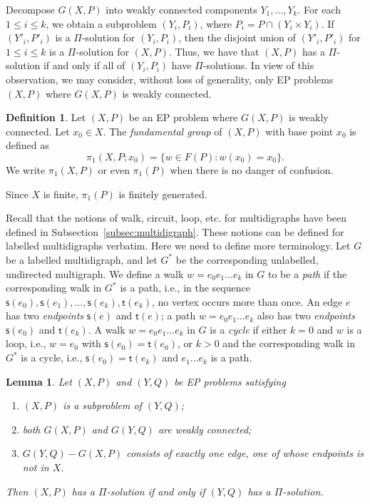 \documentclass[11pt]{amsart}
\newtheorem{lemma}[theorem]{Lemma}
\theoremstyle{definition}
\newtheorem{definition}[theorem]{Definition}
\theoremstyle{definition}
\numberwithin{equation}{section}
\begin{document}
Decompose $G(X, P)$ into weakly connected components $Y_1, \dots, Y_k$. For each $1\leq i\leq k$, we obtain a subproblem $(Y_i, P_i)$, where $P_i=P\cap (Y_i\times Y_i)$. If $(Y'_i, P'_i)$ is a $\Pi$-solution for $(Y_i, P_i)$, then the disjoint union of $(Y'_i, P'_i)$ for $1\leq i\leq k$ is a $\Pi$-solution for $(X, P)$. Thus, we have that $(X, P)$ has a $\Pi$-solution if and only if all of $(Y_i, P_i)$ have $\Pi$-solutions. In view of this observation, we may consider, without loss of generality, only EP problems $(X, P)$ where $G(X, P)$ is weakly connected. 

\begin{definition} Let $(X, P)$ be an EP problem where $G(X, P)$ is weakly connected. Let $x_0\in X$. The {\em fundamental group} of $(X, P)$ with base point $x_0$ is defined as
$$ \pi_1(X, P; x_0)=\{w\in F(P)\colon w(x_0)=x_0\}. $$
We write $\pi_1(X, P)$ or even $\pi_1(P)$ when there is no danger of confusion.
\end{definition}

Since $X$ is finite, $\pi_1(P)$ is finitely generated. 

Recall that the notions of walk, circuit, loop, etc. for multidigraphs have been defined in Subsection~\ref{subsec:multidigraph}.  These notions can be defined for labelled multidigraphs verbatim. Here we need to define more terminology. Let $G$ be a labelled multidigraph, and let $G^*$ be the corresponding unlabelled, undirected multigraph. We define a walk $w=e_0e_1\dots e_k$ in $G$ to be a {\em path} if the corresponding walk in $G^*$ is a path, i.e., in the sequence $\mathsf{s}(e_0), \mathsf{s}(e_1), \dots, \mathsf{s}(e_k), \mathsf{t}(e_k)$, no vertex occurs more than once. An edge $e$ has two {\em endpoints} $\mathsf{s}(e)$ and $\mathsf{t}(e)$; a path $w=e_0e_1\dots e_k$ also has two {\em endpoints} $\mathsf{s}(e_0)$ and $\mathsf{t}(e_k)$. A walk $w=e_0e_1\dots e_k$ in $G$ is a {\em cycle} if either $k=0$ and $w$ is a loop, i.e., $w=e_0$ with $\mathsf{s}(e_0)=\mathsf{t}(e_0)$, or $k>0$ and the corresponding walk in $G^*$ is a cycle, i.e., $\mathsf{s}(e_0)=\mathsf{t}(e_k)$ and $e_1\dots e_k$ is a path. 

\begin{lemma}\label{lem:singleedgeextension} Let $(X, P)$ and $(Y, Q)$ be EP problems satisfying
\begin{enumerate}
\item[\rm (a)] $(X, P)$ is a subproblem of $(Y, Q)$; 
\item[\rm (b)] both $G(X, P)$ and $G(Y, Q)$ are weakly connected;
\item[\rm (c)]  $G(Y, Q)-G(X, P)$ consists of exactly one edge, one of whose endpoints is not in $X$.
\end{enumerate}
Then $(X, P)$ has a $\Pi$-solution if and only if $(Y, Q)$ has a $\Pi$-solution.
\end{lemma}
\end{document}
